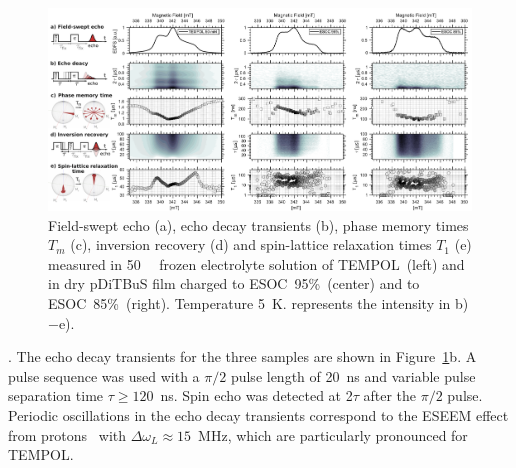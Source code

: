 \begin{figure}[ht]
	\includegraphics[width=1\textwidth]{./pulse/figures/Figure_5.pdf}%
	\caption{Field-swept echo (a), echo decay transients (b), phase memory times $T_m$ (c), inversion recovery (d) and spin-lattice relaxation times $T_1$ (e) measured in 50~\si{\milli\Molar}  frozen electrolyte solution of TEMPOL~(left) and in dry pDiTBuS film charged to ESOC~95\%~(center) and to ESOC~85\%~(right). Temperature 5~K.  represents the intensity in b)$-$e).}
	\label{fig:Figure_5}
\end{figure}


. The echo decay transients for the three samples are shown in Figure~\ref{fig:Figure_5}b. A  pulse sequence was used with a $\pi/2$ pulse length of 20~ns and variable pulse separation time $\tau\geq120$~ns. Spin echo was detected at 2$\tau$ after the $\pi/2$ pulse. Periodic oscillations in the echo decay transients correspond to the ESEEM effect from protons~\cite{Schweiger2001} with $\Delta\omega_L\approx15$~MHz, which are particularly pronounced for TEMPOL.\\ 

